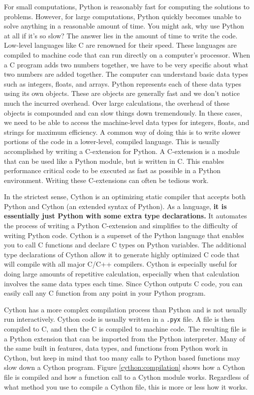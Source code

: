 \label{lab:Cython}

For small computations, Python is reasonably fast for computing the solutions to problems.
However, for large computations, Python quickly becomes unable to solve anything in a reasonable amount of time.
You might ask, why use Python at all if it's so slow?
The answer lies in the amount of time to write the code.
Low-level languages like C are renowned for their speed.  These languages are compiled to machine code that can run directly on a computer's processor.
When a C program adds two numbers together, we have to be very specific about what two numbers are added together.
The computer can understand basic data types such as integers, floats, and arrays.
Python represents each of these data types using its own objects.
These are objects are generally fast and we don't notice much the incurred overhead.
Over large calculations, the overhead of these objects is compounded and can slow things down tremendously.
In these cases, we need to be able to access the machine-level data types for integers, floats, and strings for maximum efficiency.
A common way of doing this is to write slower portions of the code in a lower-level, compiled language.
This is usually accomplished by writing a C-extension for Python.
A C-extension is a module that can be used like a Python module, but is written in C.
This enables performance critical code to be executed as fast as possible in a Python environment.
Writing these C-extensions can often be tedious work.

In the strictest sense, Cython is an optimizing static compiler that accepts both Python and Cython (an extended syntax of Python).
As a language, \textbf{it is essentially just Python with some extra type declarations.}
It automates the process of writing a Python C-extension and simplifies to the difficulty of writing Python code.
Cython is a superset of the Python language that enables you to call C functions and declare C types on Python variables.
The additional type declarations of Cython allow it to generate highly optimized C code that will compile with all major C/C++ compilers.
Cython is especially useful for doing large amounts of repetitive calculation, especially when that calculation involves the same data types each time.
Since Cython outputs C code, you can easily call any C function from any point in your Python program.

Cython has a more complex compilation process than Python and is not usually run interactively.
Cython code is usually written in a \texttt{.pyx} file.
A  file is then compiled to C, and then the C is compiled to machine code.
The resulting file is a Python extension that can be imported from the Python interpreter.
Many of the same built in features, data types, and functions from Python work in Cython, but keep in mind that too many calls to Python based functions may slow down a Cython program.
Figure \ref{cython:compilation} shows how a Cython file is compiled and how a function call to a Cython module works.
Regardless of what method you use to compile a Cython file, this is more or less how it works.


